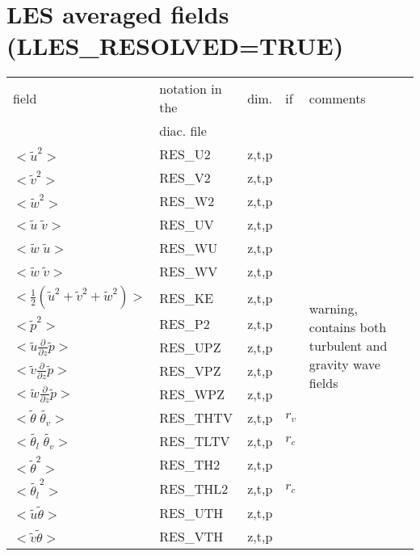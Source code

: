 \section{LES averaged fields (LLES\_RESOLVED=TRUE)}

\begin{center}
\begin{makeimage}
\begin{tabular}{||p{6cm}|>{\centering}p{2.5cm}|>{\centering}p{1.5cm}|>{\centering}p{0.5cm}|p{5cm }||}
\hline
\hline
field & notation in the & dim. &if     & comments \\
      & diac. file &           &  & \\
\hline
\hline
$<\tilde{u}^2>$ & RES\_U2 & z,t,p & &\multirow{25}{5cm}{warning, contains both turbulent and gravity wave fields }\\
\cline{1-4}
$<\tilde{v}^2>$ & RES\_V2 &z,t,p &   & \\
\cline{1-4}
$<\tilde{w}^2>$ & RES\_W2 &z,t,p &   & \\
\cline{1-4}
$<\tilde{u}\;\tilde{v}>$ & RES\_UV &z,t,p &   &\\
\cline{1-4}
$<\tilde{w}\;\tilde{u}>$ & RES\_WU &z,t,p &   & \\
\cline{1-4}
$<\tilde{w}\;\tilde{v}>$ & RES\_WV &z,t,p &   &\\
\cline{1-4}
$<\frac{1}{2}(\tilde{u}^2+\tilde{v}^2+\tilde{w}^2)>$ & RES\_KE &z,t,p &   &\\
\cline{1-4}
$<\tilde{p}^2>$ & RES\_P2 & z,t,p &  & \\
\cline{1-4}
$<\tilde{u}\frac{\partial}{\partial z}\tilde{p}>$ & RES\_UPZ & z,t,p &  &\\
\cline{1-4}
$<\tilde{v}\frac{\partial}{\partial z}\tilde{p}>$ & RES\_VPZ & z,t,p &  &\\
\cline{1-4}
$<\tilde{w}\frac{\partial}{\partial z}\tilde{p}>$ & RES\_WPZ & z,t,p &  &\\
\cline{1-4}
$<\tilde{\theta}\;\tilde{\theta_v}>$ & RES\_THTV &z,t,p &  $r_v$  &\\
\cline{1-4}
$<\tilde{\theta_l}\;\tilde{\theta_v}>$ & RES\_TLTV &z,t,p &  $r_c$  &\\
\cline{1-4}
$<\tilde{\theta}^2>$ & RES\_TH2 &z,t,p &   &\\
\cline{1-4}
$<\tilde{\theta_l}^2>$ & RES\_THL2 &z,t,p &  $r_c$  &\\
\cline{1-4}
$<\tilde{u}\tilde{\theta}>$ & RES\_UTH &z,t,p &   & \\
\cline{1-4}
$<\tilde{v}\tilde{\theta}>$ & RES\_VTH &z,t,p &   &\\

\end{tabular}
\end{makeimage}
\end{center}
